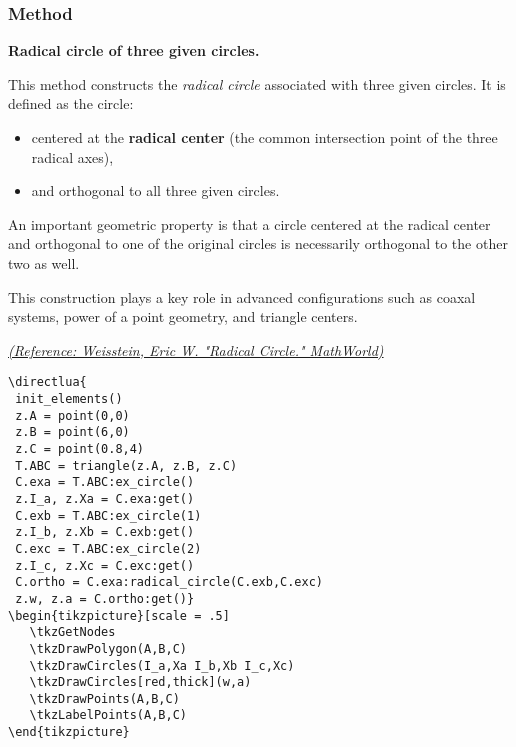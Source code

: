 \subsubsection{Method }
\label{ssub:radical_circle}

\textbf{Radical circle of three given circles.}

\medskip
\noindent
This method constructs the \emph{radical circle} associated with three given circles. It is defined as the circle:

\begin{itemize}
  \item centered at the \textbf{radical center} (the common intersection point of the three radical axes),
  \item and orthogonal to all three given circles.
\end{itemize}

\noindent
An important geometric property is that a circle centered at the radical center and orthogonal to one of the original circles is necessarily orthogonal to the other two as well.

\medskip
\noindent
This construction plays a key role in advanced configurations such as coaxal systems, power of a point geometry, and triangle centers.
\begin{flushright}
\small
\href{https://mathworld.wolfram.com/RadicalCircle.html}{\textit{(Reference: Weisstein, Eric W. "Radical Circle." MathWorld)}}
\end{flushright}

\vspace{1em}



\begin{minipage}[t]{.5\textwidth}\vspace{0pt}%
\begin{verbatim}
\directlua{
 init_elements()
 z.A = point(0,0)
 z.B = point(6,0)
 z.C = point(0.8,4)
 T.ABC = triangle(z.A, z.B, z.C)
 C.exa = T.ABC:ex_circle()
 z.I_a, z.Xa = C.exa:get()
 C.exb = T.ABC:ex_circle(1)
 z.I_b, z.Xb = C.exb:get()
 C.exc = T.ABC:ex_circle(2)
 z.I_c, z.Xc = C.exc:get()
 C.ortho = C.exa:radical_circle(C.exb,C.exc)
 z.w, z.a = C.ortho:get()}
\begin{tikzpicture}[scale = .5]
   \tkzGetNodes
   \tkzDrawPolygon(A,B,C)
   \tkzDrawCircles(I_a,Xa I_b,Xb I_c,Xc)
   \tkzDrawCircles[red,thick](w,a)
   \tkzDrawPoints(A,B,C)
   \tkzLabelPoints(A,B,C)
\end{tikzpicture}
\end{verbatim}
\end{minipage}

